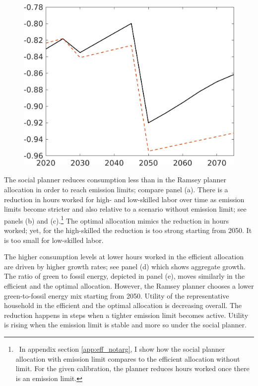 \begin{figure}[h!!]
\begin{minipage}[]{0.32\textwidth}
\end{minipage}
\begin{minipage}[]{0.32\textwidth}
	\includegraphics[width=1\textwidth]{../../codding_model/own_basedOnFried/optimalPol_190722_tidiedUp/figures/all_July22/SWF_CompEffOPT_T_NoTaus_opteff_spillover0_noskill0_sep1_xgrowth0_countec0_etaa0.79_lgd0_lff0.png}
\end{minipage}
\end{figure}

The social planner reduces consumption less than in the Ramsey planner allocation in order to reach emission limits; compare panel (a). There is a reduction in hours worked for high- and low-skilled labor over time as emission limits become stricter and also relative to a scenario without emission limit; see panels (b) and (c).\footnote{\ In appendix section \ref{app:eff_notarg}, I show how the social planner allocation with emission limit compares to the efficient allocation without limit. For the given calibration, the planner reduces hours worked once there is an emission limit.} 
The optimal allocation mimics the reduction in hours worked; yet, for the high-skilled the reduction is too strong starting from 2050. It is too small for low-skilled labor. 

The higher consumption levels at lower hours worked in the efficient allocation are driven by higher growth rates; see panel (d) which shows aggregate growth. The ratio of green to fossil energy, depicted in panel (e), moves similarly in the efficient and the optimal allocation. However, the Ramsey planner chooses a lower green-to-fossil energy mix starting from 2050. Utility of the representative household in the efficient and the optimal allocation is decreasing overall. The reduction happens in steps when a tighter emission limit becomes active. Utility is rising when the emission limit is stable and more so under the social planner. 

